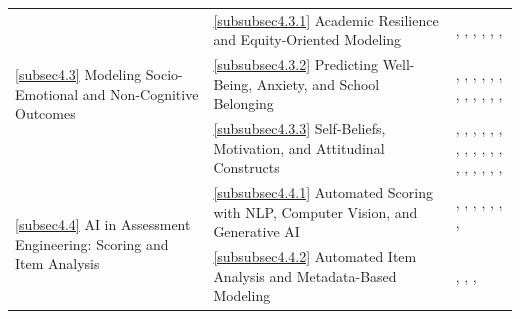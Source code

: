 \documentclass{ieeeaccess}
\begin{document}
\begin{table}[!t]
\begin{tabular}{p{2.7cm}p{6.7cm}p{6.8cm}}
\multirow{3}{=}{\parbox[t]{2.8cm}{\ref{subsec4.3} Modeling Socio-Emotional and Non-Cognitive Outcomes}}
& \ref{subsubsec4.3.1} Academic Resilience and Equity-Oriented Modeling
& \cite{zheng-etal2023}, \cite{choi-sung2024}, \cite{cheung-etal2024}, \cite{zheng-cheung-sit-lam2025}, \cite{teigIdentifyingPatternsStudents2020}, \cite{xuExploringEffectDigitization2025}, \cite{weiIdentifyingKeyPredictors2026}\\
\addlinespace

& \ref{subsubsec4.3.2} Predicting Well-Being, Anxiety, and School Belonging
& \cite{immekus-etal2022}, \cite{encarnacao-etal2025}, \cite{pan-cutumisu2024}, \cite{resino-constante-amores2024}, \cite{lim-etal2024}, \cite{wang-king-leung2022}, \cite{wang-king-leung2023}, \cite{chungInternationalComparisonStudy2022}, \cite{jerrimHasPeakPISA2024}, \cite{suarez-mesaDoesTeachersMotivation2024}, \cite{dossantosEducationDataMining2021}, \cite{wuPredictingKeyFactors2026}, \cite{qabliyaneSupervisedMachineLearningBased2026}\\
\addlinespace

& \ref{subsubsec4.3.3} Self-Beliefs, Motivation, and Attitudinal Constructs
& \cite{hernandez-ramos-araya2025}, \cite{aydogan-tat2024}, \cite{hu-etal-Predicting-Adolescents-2025}, \cite{mcjames-etal2023}, \cite{kim-etal2024}, \cite{tan-etal2025}, \cite{ramazan-etal2023}, \cite{cai-etal2025}, \cite{khine-etal2025}, \cite{camposDigitalGenderGaps2024}, \cite{damianiYoungPeoplesCivic2024}, \cite{he-etal2024}, \cite{tahriMLApplicationsPredictin2026}, \cite{ramazanStudents2018PISA2023}, \cite{veleticExploringSchoolLeadership2024}, \cite{mangSamplingWeightsMultilevel2021}, \cite{martinez-abadEducationalDataMining2020}, \cite{tahriMachineLearningApplicationsPredicting2026}, \cite{caiExploringImpactICT2026}\\
\midrule

\multirow{2}{=}{\parbox[t]{2.8cm}{\ref{subsec4.4} AI in Assessment Engineering: Scoring and Item Analysis}}
& \ref{subsubsec4.4.1} Automated Scoring with NLP, Computer Vision, and Generative AI
& \cite{jung-etal2024}, \cite{tyack-etal2024}, \cite{jung-etal2022}, \cite{goldman-etal2025}, \cite{ripollyschmitz-etal2025}, \cite{tangFactorsPredictingCollaborative2021}, \cite{gamazoExplorationFactorsLinked2020b}, \cite{filizEducationDataMining2020} \\
\addlinespace

& \ref{subsubsec4.4.2} Automated Item Analysis and Metadata-Based Modeling
& \cite{peters-etal2025}, \cite{peters-etal2025a}, \cite{rausch-etal2024}, \cite{kilicdeprenCrossCulturalComparisonsFactors2022} \\
\midrule


\end{tabular}
\end{table}
\end{document}
